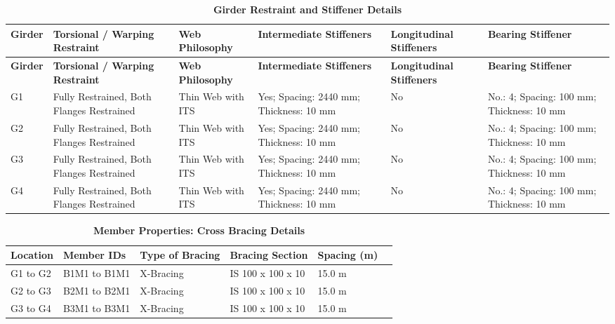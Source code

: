 \documentclass[12pt,a4paper]{report}
\numberwithin{table}{chapter}
\numberwithin{figure}{chapter}
\begin{document}
\vspace{4pt}
\begin{longtable}{|L{1.4cm}|p{2.2cm}|p{2.2cm}|p{3.0cm}|p{2.4cm}|p{2.2cm}|}
\caption{\textbf{Girder Restraint and Stiffener Details}}\\
\hline
\textbf{Girder} & \textbf{Torsional / Warping Restraint} & \textbf{Web Philosophy} & \textbf{Intermediate Stiffeners} & \textbf{Longitudinal Stiffeners} & \textbf{Bearing Stiffener} \\[6pt]
\hline
\endfirsthead
\hline
\textbf{Girder} & \textbf{Torsional / Warping Restraint} & \textbf{Web Philosophy} & \textbf{Intermediate Stiffeners} & \textbf{Longitudinal Stiffeners} & \textbf{Bearing Stiffener} \\[6pt]
\hline
\endhead

G1 & Fully Restrained, Both Flanges Restrained & Thin Web with ITS & Yes; Spacing: 2440 mm; Thickness: 10 mm & No & No.: 4; Spacing: 100 mm; Thickness: 10 mm \\[8pt]
\hline
G2 & Fully Restrained, Both Flanges Restrained & Thin Web with ITS & Yes; Spacing: 2440 mm; Thickness: 10 mm & No & No.: 4; Spacing: 100 mm; Thickness: 10 mm \\[8pt]
\hline
G3 & Fully Restrained, Both Flanges Restrained & Thin Web with ITS & Yes; Spacing: 2440 mm; Thickness: 10 mm & No & No.: 4; Spacing: 100 mm; Thickness: 10 mm \\[8pt]
\hline
G4 & Fully Restrained, Both Flanges Restrained & Thin Web with ITS & Yes; Spacing: 2440 mm; Thickness: 10 mm & No & No.: 4; Spacing: 100 mm; Thickness: 10 mm \\[8pt]
\hline
\end{longtable}



\newpage

\vspace{0.4em}
\setlength{\tabcolsep}{4pt}
\setlength\LTleft{0pt}
\setlength\LTright{\fill}

\begin{longtable}{|L{2.2cm}|L{2.2cm}|L{3.0cm}|L{2.5cm}|C{1.8cm}|C{1.8cm}|}
\caption{\textbf{Member Properties: Cross Bracing Details}}
\hline
\textbf{Location} & \textbf{Member IDs} & \textbf{Type of Bracing} & \textbf{Bracing Section} & \textbf{Spacing (m)} \\
\hline
G1 to G2 & B1M1 to B1M1 & X-Bracing & IS 100 x 100 x 10 & 15.0 m \\[6pt]
\hline
G2 to G3 & B2M1 to B2M1 & X-Bracing & IS 100 x 100 x 10 & 15.0 m \\[6pt]
\hline
G3 to G4 & B3M1 to B3M1 & X-Bracing & IS 100 x 100 x 10 & 15.0 m \\[6pt]
\hline
\end{longtable}
\end{document}
